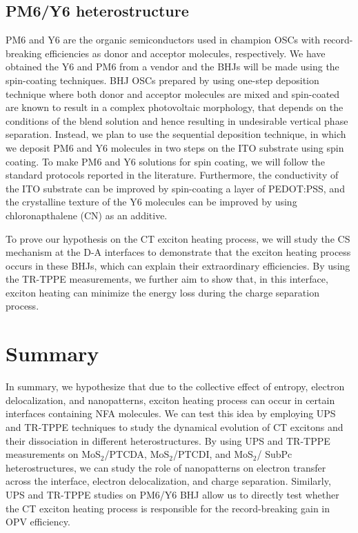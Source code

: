 \documentclass[12pt]{article}
\begin{document}
\subsection{PM6/Y6 heterostructure}
PM6 and Y6 are the organic semiconductors used in champion OSCs with record-breaking efficiencies as donor and acceptor molecules, respectively. We have obtained the Y6 and PM6 from a vendor and the BHJs will be made using the spin-coating techniques. BHJ OSCs prepared  by using one-step deposition technique where both donor and acceptor molecules are mixed and spin-coated are known to result in a complex photovoltaic morphology, that depends on the conditions of the blend solution and hence resulting in undesirable vertical phase separation. Instead, we plan to use the sequential deposition technique, in which we deposit PM6 and Y6 molecules in two steps on the ITO substrate using spin coating. To make PM6 and Y6 solutions for spin coating, we will follow the standard protocols reported in the literature. Furthermore, the conductivity of the ITO substrate can be improved by spin-coating a layer of PEDOT:PSS, and the crystalline texture of the Y6 molecules can be improved by using chloronapthalene (CN) as an additive.

To prove our hypothesis on the CT exciton heating process, we will study the CS mechanism at the D-A interfaces to demonstrate that the exciton heating process occurs in these BHJs, which can explain their extraordinary efficiencies. By using the TR-TPPE measurements, we further aim to show that, in this interface, exciton heating can minimize the energy loss during the charge separation process.



\section{Summary}
In summary, we hypothesize that due to the collective effect of entropy, electron delocalization, and nanopatterns, exciton heating process can occur in certain interfaces containing NFA molecules. We can test this idea by employing UPS and TR-TPPE techniques to study the dynamical evolution of CT excitons and their dissociation in different heterostructures. By using UPS and TR-TPPE measurements on MoS$_2$/PTCDA, MoS$_2$/PTCDI, and MoS$_2$/ SubPc heterostructures, we can study the role of nanopatterns on electron transfer across the interface, electron delocalization, and charge separation. Similarly, UPS and TR-TPPE studies on PM6/Y6 BHJ allow us to directly test whether the CT exciton heating process is responsible for the record-breaking gain in OPV efficiency.



\end{document}
